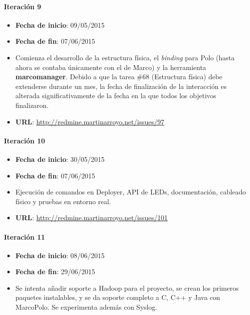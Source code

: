 \paragraph{Iteración 9\\}
\begin{itemize}
\item \textbf{Fecha de inicio}: 09/05/2015
\item \textbf{Fecha de fin}: 07/06/2015
\item Comienza el desarrollo de la estructura física, el \textit{binding} para Polo (hasta ahora se contaba únicamente con el de Marco) y la herramienta \textbf{marcomanager}. Debido a que la tarea \#68 (Estructura física) debe extenderse durante un mes, la fecha de finalización de la interacción es alterada significativamente de la fecha en la que todos los objetivos finalizaron.
\item \textbf{URL}: \href{http://redmine.martinarroyo.net/issues/97}{http://redmine.martinarroyo.net/issues/97}
\end{itemize}
\paragraph{Iteración 10\\}
\begin{itemize}
\item \textbf{Fecha de inicio}: 30/05/2015
\item \textbf{Fecha de fin}: 07/06/2015
\item Ejecución de comandos en Deployer, API de LEDs, documentación, cableado físico y pruebas en entorno real.
\item \textbf{URL}: \href{http://redmine.martinarroyo.net/issues/101}{http://redmine.martinarroyo.net/issues/101}
\end{itemize}

\paragraph{Iteración 11\\}
\begin{itemize}
\item \textbf{Fecha de inicio}: 08/06/2015
\item \textbf{Fecha de fin}: 29/06/2015
\item Se intenta añadir soporte a Hadoop para el proyecto, se crean los primeros paquetes instalables, y se da soporte completo a C, C++ y Java con MarcoPolo. Se experimenta además con Syslog.
\end{itemize}


